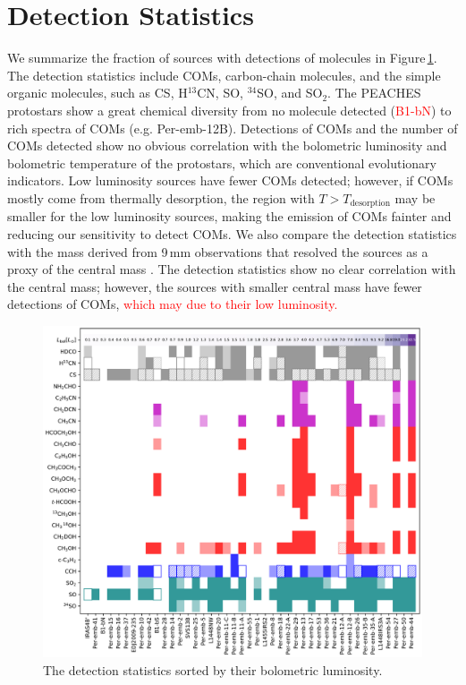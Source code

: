 \documentclass[twocolumn]{aastex62}
\newcommand{\htcn}{\mbox{H$^{13}$CN}}
\begin{document}
\section{Detection Statistics}
We summarize the fraction of sources with detections of molecules in Figure\,\ref{fig:stats}.  The detection statistics include COMs, carbon-chain molecules, and the simple organic molecules, such as CS, \htcn, SO, $^{34}$SO, and SO$_{2}$.  The PEACHES protostars show a great chemical diversity from no molecule detected (\textcolor{red}{B1-bN}) to rich spectra of COMs (e.g. Per-emb-12B).  Detections of COMs and the number of COMs detected show no obvious correlation with the bolometric luminosity and bolometric temperature of the protostars, which are conventional evolutionary indicators.  Low luminosity sources have fewer COMs detected; however, if COMs mostly come from thermally desorption, the region with $T > T_\text{desorption}$ may be smaller for the low luminosity sources, making the emission of COMs fainter and reducing our sensitivity to detect COMs.  We also compare the detection statistics with the mass derived from 9\,mm observations that resolved the sources as a proxy of the central mass \citep{2018ApJS..238...19T}.  The detection statistics show no clear correlation with the central mass; however, the sources with smaller central mass have fewer detections of COMs, \textcolor{red}{which may due to their low luminosity.}  

\begin{figure}[htbp!]
  \centering
  \includegraphics[width=\textwidth]{stats_sorted_by_lbol.pdf}
  \caption{The detection statistics sorted by their bolometric luminosity.}
  \label{fig:stats}
\end{figure}
\end{document}
